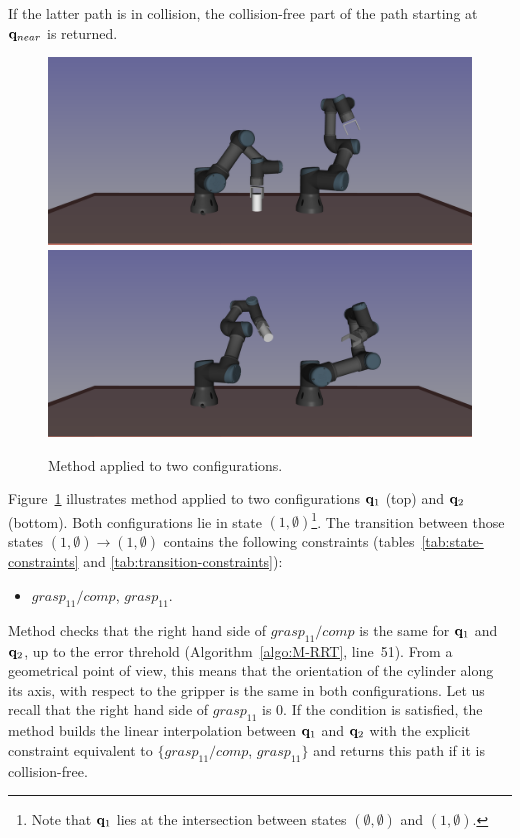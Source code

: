 If the latter path is in collision, the collision-free part of the path starting
at $\mathbf{q}_{near}$ is returned.

\begin{figure}
  \begin{center}
    \includegraphics[width=.75\linewidth]{figures/example-qtarget-1.png}
    \includegraphics[width=.75\linewidth]{figures/example-connect-q1.png}
  \end{center}
  \caption{Method \CONNECT applied to two configurations.}
  \label{fig:connect}
\end{figure}

Figure~\ref{fig:connect} illustrates method \CONNECT applied to two configurations $\mathbf{q}_1$ (top) and $\mathbf{q}_2$ (bottom). Both configurations lie in state $(1,\emptyset)$\footnote{Note that $\mathbf{q}_1$ lies at the intersection between states
  $(\emptyset,\emptyset)$ and $(1,\emptyset)$.}. The transition between those states $(1,\emptyset)\rightarrow(1,\emptyset)$ contains the following constraints (tables~\ref{tab:state-constraints} and \ref{tab:transition-constraints}):
\begin{itemize}
\item $grasp_{11}/comp$, $grasp_{11}$.
\end{itemize}
Method \CONNECT checks that the right hand side of $grasp_{11}/comp$ is the same
for $\mathbf{q}_1$ and $\mathbf{q}_2$, up to the error threhold (Algorithm~\ref{algo:M-RRT}, line~51). From a geometrical point of view, this means that the orientation of the cylinder along its axis, with respect to the gripper is the same in both configurations. Let us recall that the right hand side of $grasp_{11}$ is 0. If the condition is satisfied, the method builds the linear interpolation between $\mathbf{q}_1$ and $\mathbf{q}_2$ with the explicit constraint equivalent to $\{grasp_{11}/comp$, $grasp_{11}\}$ and returns this path if it is collision-free.


